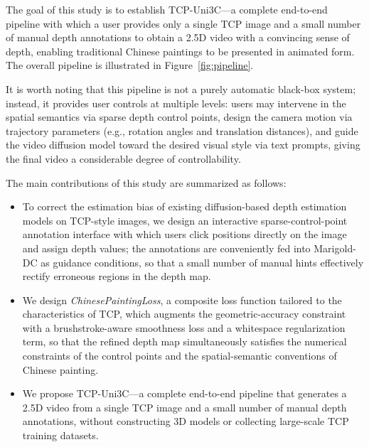 The goal of this study is to establish TCP-Uni3C---a complete end-to-end pipeline
with which a user provides only a single TCP image and a small number of manual depth annotations
to obtain a 2.5D video with a convincing sense of depth,
enabling traditional Chinese paintings to be presented in animated form.
The overall pipeline is illustrated in Figure~\ref{fig:pipeline}.

It is worth noting that this pipeline is not a purely automatic black-box system;
instead, it provides user controls at multiple levels:
users may intervene in the spatial semantics via sparse depth control points,
design the camera motion via trajectory parameters (e.g., rotation angles and translation distances),
and guide the video diffusion model toward the desired visual style via text prompts,
giving the final video a considerable degree of controllability.

The main contributions of this study are summarized as follows:

\begin{itemize}
  \item To correct the estimation bias of existing diffusion-based depth estimation models on TCP-style images,
        we design an interactive sparse-control-point annotation interface
        with which users click positions directly on the image and assign depth values;
        the annotations are conveniently fed into Marigold-DC as guidance conditions,
        so that a small number of manual hints effectively rectify erroneous regions in the depth map.

  \item We design \textit{ChinesePaintingLoss}, a composite loss function tailored to the characteristics of TCP,
        which augments the geometric-accuracy constraint with a brushstroke-aware smoothness loss
        and a whitespace regularization term,
        so that the refined depth map simultaneously satisfies the numerical constraints of the control points
        and the spatial-semantic conventions of Chinese painting.

  \item We propose TCP-Uni3C---a complete end-to-end pipeline that generates a 2.5D video
        from a single TCP image and a small number of manual depth annotations,
        without constructing 3D models or collecting large-scale TCP training datasets.
\end{itemize}
